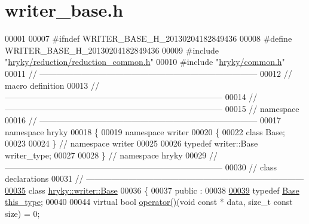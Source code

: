 \hypertarget{writer__base_8h_source}{\section{writer\-\_\-base.\-h}
}

\begin{DoxyCode}
00001 
00007 \textcolor{preprocessor}{#ifndef WRITER\_BASE\_H\_20130204182849436}
00008 \textcolor{preprocessor}{}\textcolor{preprocessor}{#define WRITER\_BASE\_H\_20130204182849436}
00009 \textcolor{preprocessor}{}\textcolor{preprocessor}{#include "\hyperlink{reduction__common_8h}{hryky/reduction/reduction_common.h}"}
00010 \textcolor{preprocessor}{#include "\hyperlink{common_8h}{hryky/common.h}"}
00011 \textcolor{comment}{//
      ------------------------------------------------------------------------------}
00012 \textcolor{comment}{// macro definition}
00013 \textcolor{comment}{//
      ------------------------------------------------------------------------------}
00014 \textcolor{comment}{//
      ------------------------------------------------------------------------------}
00015 \textcolor{comment}{// namespace}
00016 \textcolor{comment}{//
      ------------------------------------------------------------------------------}
00017 \textcolor{keyword}{namespace }hryky
00018 \{
00019 \textcolor{keyword}{namespace }writer
00020 \{
00022     \textcolor{keyword}{class }Base;
00023 
00024 \} \textcolor{comment}{// namespace writer}
00025 
00026 \textcolor{keyword}{typedef} writer::Base writer\_type;
00027 
00028 \} \textcolor{comment}{// namespace hryky}
00029 \textcolor{comment}{//
      ------------------------------------------------------------------------------}
00030 \textcolor{comment}{// class declarations}
00031 \textcolor{comment}{//
      ------------------------------------------------------------------------------}
\hypertarget{writer__base_8h_source_l00035}{}\hyperlink{classhryky_1_1writer_1_1_base}{00035} \textcolor{comment}{}\textcolor{keyword}{class }\hyperlink{classhryky_1_1writer_1_1_base}{hryky::writer::Base}
00036 \{
00037 \textcolor{keyword}{public} :
00038 
\hypertarget{writer__base_8h_source_l00039}{}\hyperlink{classhryky_1_1writer_1_1_base_a2da49d5140295f9ae7f5f27c9677278e}{00039}     \textcolor{keyword}{typedef} \hyperlink{classhryky_1_1writer_1_1_base}{Base} \hyperlink{classhryky_1_1writer_1_1_base_a2da49d5140295f9ae7f5f27c9677278e}{this_type};
00040 
00044     \textcolor{keyword}{virtual} \textcolor{keywordtype}{bool} \hyperlink{classhryky_1_1writer_1_1_base_a19d3bc3fa440d45dbbee33475c3916c3}{operator()}(\textcolor{keywordtype}{void} \textcolor{keyword}{const} * data, \textcolor{keywordtype}{size\_t} \textcolor{keyword}{const} size) = 0;

\end{DoxyCode}

